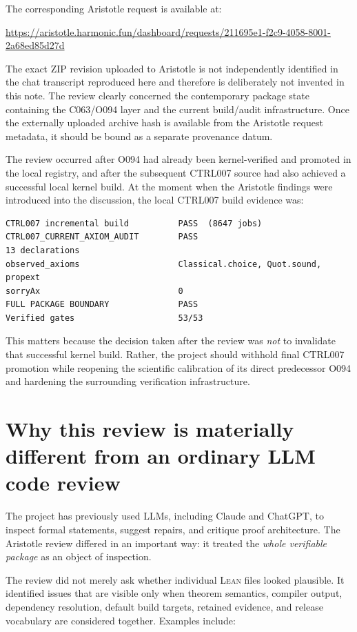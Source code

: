 \documentclass[11pt,a4paper]{article}
\newcommand{\Lean}{\textsc{Lean}}
\begin{document}
The corresponding Aristotle request is available at:

\begin{center}
\url{https://aristotle.harmonic.fun/dashboard/requests/211695e1-f2c9-4058-8001-2a68ed85d27d}
\end{center}

The exact ZIP revision uploaded to Aristotle is not independently identified in the chat transcript reproduced here and therefore is deliberately not invented in this note. The review clearly concerned the contemporary package state containing the C063/O094 layer and the current build/audit infrastructure. Once the externally uploaded archive hash is available from the Aristotle request metadata, it should be bound as a separate provenance datum.

The review occurred after O094 had already been kernel-verified and promoted in the local registry, and after the subsequent CTRL007 source had also achieved a successful local kernel build. At the moment when the Aristotle findings were introduced into the discussion, the local CTRL007 build evidence was:

\begin{lstlisting}
CTRL007 incremental build          PASS  (8647 jobs)
CTRL007_CURRENT_AXIOM_AUDIT        PASS
13 declarations
observed_axioms                    Classical.choice, Quot.sound, propext
sorryAx                            0
FULL PACKAGE BOUNDARY              PASS
Verified gates                     53/53
\end{lstlisting}

This matters because the decision taken after the review was \emph{not} to invalidate that successful kernel build. Rather, the project should withhold final CTRL007 promotion while reopening the scientific calibration of its direct predecessor O094 and hardening the surrounding verification infrastructure.

\section{Why this review is materially different from an ordinary LLM code review}

The project has previously used LLMs, including Claude and ChatGPT, to inspect formal statements, suggest repairs, and critique proof architecture. The Aristotle review differed in an important way: it treated the \emph{whole verifiable package} as an object of inspection.

The review did not merely ask whether individual \Lean{} files looked plausible. It identified issues that are visible only when theorem semantics, compiler output, dependency resolution, default build targets, retained evidence, and release vocabulary are considered together. Examples include:
\end{document}
